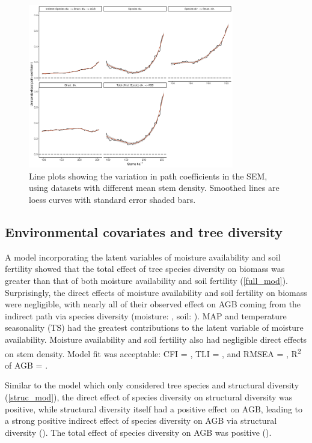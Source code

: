 \documentclass[11pt,a4paper]{article}
\begin{document}
\begin{figure}[H]
\centering
	\includegraphics[width=0.8\textwidth]{sem_struc_stems_ha}
	\caption{Line plots showing the variation in path coefficients in the SEM, using datasets with different mean stem density. Smoothed lines are loess curves with standard error shaded bars.}
	\label{sem_struc_stems_ha}
\end{figure}

\subsection{Environmental covariates and tree diversity}

A model incorporating the latent variables of moisture availability and soil fertility showed that the total effect of tree species diversity on biomass was greater than that of both moisture availability and soil fertility (\autoref{full_mod}). Surprisingly, the direct effects of moisture availability and soil fertility on biomass were negligible, with nearly all of their observed effect on AGB coming from the indirect path via species diversity (moisture: \rgmbd{}, soil: \rgsbd{}). MAP and temperature seasonality (TS) had the greatest contributions to the latent variable of moisture availability. Moisture availability and soil fertility also had negligible direct effects on stem density.  Model fit was acceptable: CFI = \fmcfi{}, TLI = \fmtli{}, and RMSEA = \fmrmsea{}, R\textsuperscript{2} of AGB = \fmrsq{}.

Similar to the model which only considered tree species and structural diversity (\autoref{struc_mod}), the direct effect of species diversity on structural diversity was positive, while structural diversity itself had a positive effect on AGB, leading to a strong positive indirect effect of species diversity on AGB via structural diversity (\rgbhd{}). The total effect of species diversity on AGB was positive (\rgbd{}).
\end{document}
